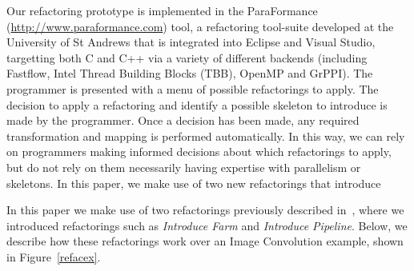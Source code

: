 \documentclass[smallextended]{svjour3}
\begin{document}
\noindent
Our refactoring
prototype is implemented in the ParaFormance (\url{http://www.paraformance.com}) tool, a refactoring tool-suite developed at the University of St Andrews that is integrated into Eclipse and Visual Studio, targetting both C and C++ via a variety of different backends (including Fastflow, Intel Thread Building Blocks (TBB), OpenMP and GrPPI).  
 The programmer is presented with a menu of possible refactorings to
apply.  The decision to apply a refactoring and identify a possible
skeleton to introduce is made by the programmer. Once a decision
has been made, any required transformation and mapping is performed automatically. In this way, we can rely on programmers making informed
decisions about which refactorings to apply, but do not rely on them %
necessarily having expertise with parallelism or skeletons.  
In this paper, we make use of two new refactorings that introduce 

In this paper we make use of two refactorings previously described in~\cite{pdp2014}, where we introduced refactorings  such as
\emph{Introduce Farm} and \emph{Introduce Pipeline}. Below, we describe how these refactorings work over an Image Convolution example, shown in Figure~\ref{refacex}. %
\end{document}
